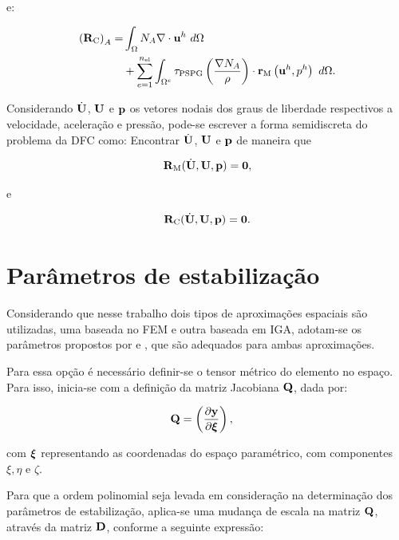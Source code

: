 \documentclass[tese_patricia]{subfiles}%
\begin{document}
\noindent e:

\begin{align}
	\begin{split}
	\left(\mathbf{R}_\mathrm{C}\right)_{A} = &\int_{\Omega} N_A \nabla \cdot \mathbf{u}^h \ d\Omega \\ 
	&+ \sum_{e=1}^{n_{\mathrm{el}}} \int_{\Omega^e} \tau_{\mathrm{PSPG}} \left(\frac{\nabla N_A}{\rho}\right) \cdot \mathbf{r}_{\mathrm{M}}\left(\mathbf{u}^h,p^h\right) \  d\Omega.
	\end{split}
\end{align}
		
Considerando $\dot{\mathbf{U}}$, $\mathbf{U}$ e $\mathbf{p}$ os vetores nodais dos graus de liberdade respectivos a velocidade, aceleração e pressão, pode-se escrever a forma semidiscreta do problema da DFC como: Encontrar $\dot{\mathbf{U}}$, $\mathbf{U}$ e $\mathbf{p}$ de maneira que

\begin{align}
\mathbf{R}_\mathrm{M}(\dot{\mathbf{U}},\mathbf{U},\mathbf{p}) = \mathbf{0},\label{eq:momentum_residual}
\end{align}

\noindent e

\begin{align}
\mathbf{R}_\mathrm{C}(\dot{\mathbf{U}},\mathbf{U},\mathbf{p}) = \mathbf{0}. \label{eq:continuity_residual}
\end{align}




\section{Parâmetros de estabilização}\label{sec:taus}

Considerando que nesse trabalho dois tipos de aproximações espaciais são utilizadas, uma baseada no FEM e outra baseada em IGA, adotam-se os parâmetros propostos por  e , que são adequados para ambas aproximações. 

Para essa opção é necessário definir-se o tensor métrico do elemento no espaço. Para isso, inicia-se com a definição da matriz Jacobiana $\mathbf{Q}$, dada por:

\begin{align}
	\mathbf{Q}&=\left(\frac{\partial\mathbf{y}}{\partial\bm{\xi}}\right),
\end{align}

\noindent com $\bm{\xi}$ representando as coordenadas do espaço paramétrico, com componentes $\xi, \eta$ e $\zeta$.

Para que a ordem polinomial seja levada em consideração na determinação dos parâmetros de estabilização, aplica-se uma mudança de escala na matriz $\mathbf{Q}$, através da matriz $\mathbf{D}$, conforme a seguinte expressão:
\end{document}
